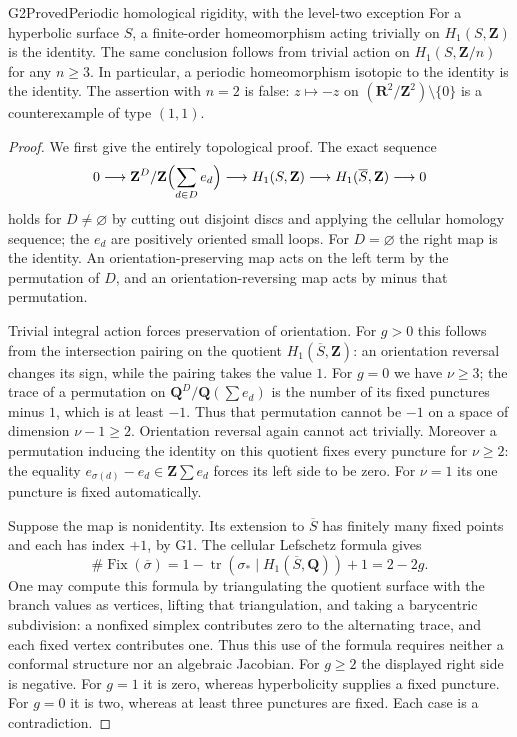 \begin{result}{G2}{Proved}{Periodic homological rigidity, with the level-two exception}
For a hyperbolic surface $S$, a finite-order homeomorphism acting trivially
on $H_1(S,\mathbf Z)$ is the identity. The same conclusion follows from
trivial action on $H_1(S,\mathbf Z/n)$ for any $n\geq3$. In particular,
a periodic homeomorphism isotopic to the identity is the identity.
The assertion with $n=2$ is false: $z\mapsto-z$ on
$(\mathbf R^2/\mathbf Z^2)\setminus\{0\}$ is a counterexample of type
$(1,1)$.
\end{result}
\begin{proof}
We first give the entirely topological proof. The exact sequence
\[
 0\longrightarrow
 \mathbf Z^{D}/\mathbf Z\Bigl(\sum_{d\in D}e_d\Bigr)
 \longrightarrow H_1(S,\mathbf Z)
 \longrightarrow H_1(\overline S,\mathbf Z)\longrightarrow0
\]
holds for $D\ne\varnothing$ by cutting out disjoint discs and applying
the cellular homology sequence; the $e_d$ are positively oriented small
loops. For $D=\varnothing$ the right map is the identity. An
orientation-preserving map acts on the left term by the permutation of
$D$, and an orientation-reversing map acts by minus that permutation.

Trivial integral action forces preservation of orientation. For $g>0$
this follows from the intersection pairing on the quotient
$H_1(\overline S,\mathbf Z)$: an orientation reversal changes its sign,
while the pairing takes the value $1$. For $g=0$ we have $\nu\geq3$;
the trace of a permutation on
$\mathbf Q^D/\mathbf Q(\sum e_d)$ is the number of its fixed punctures
minus $1$, which is at least $-1$. Thus that permutation cannot be
$-1$ on a space of dimension $\nu-1\geq2$. Orientation reversal again
cannot act trivially. Moreover a permutation inducing the identity on
this quotient fixes every puncture for $\nu\geq2$: the equality
$e_{\sigma(d)}-e_d\in\mathbf Z\sum e_d$ forces its left side to be zero.
For $\nu=1$ its one puncture is fixed automatically.

Suppose the map is nonidentity. Its extension to $\overline S$ has
finitely many fixed points and each has index $+1$, by G1. The cellular
Lefschetz formula gives
\[
 \#\operatorname{Fix}(\overline\sigma)
 =1-\operatorname{tr}(\sigma_*\mid H_1(\overline S,\mathbf Q))+1
 =2-2g.
\]
One may compute this formula by triangulating the quotient surface with
the branch values as vertices, lifting that triangulation, and taking a
barycentric subdivision: a nonfixed simplex contributes zero to the
alternating trace, and each fixed vertex contributes one. Thus this use
of the formula requires neither a conformal structure nor an algebraic
Jacobian. For $g\geq2$ the displayed right side is negative. For $g=1$
it is zero, whereas hyperbolicity supplies a fixed puncture. For $g=0$
it is two, whereas at least three punctures are fixed. Each case is a
contradiction.


\end{proof}
